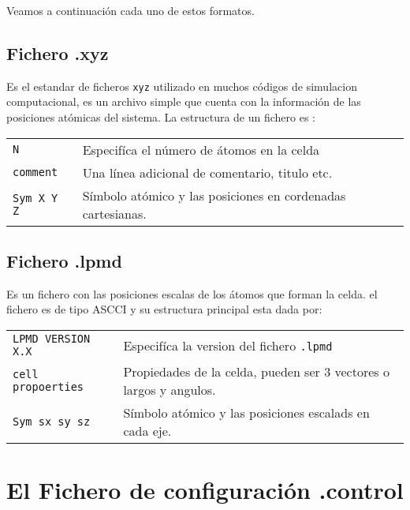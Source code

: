 \documentclass[a4paper,10pt]{scrbook}
\begin{document}
Veamos a continuaci\'on cada uno de estos formatos.

\subsection{Fichero .xyz}

Es el estandar de ficheros \verb|xyz| utilizado en muchos c\'odigos de simulacion computacional, es un archivo simple que cuenta con la informaci\'on de las posiciones at\'omicas del sistema. La estructura de un fichero es :
\begin{center}
\begin{tabular}{l|l}
 \verb|N| & Especif\'ica el n\'umero de \'atomos en la celda \\
 \verb|comment| & Una l\'inea adicional de comentario, titulo etc. \\
 \verb|Sym X Y Z| & S\'imbolo at\'omico y las posiciones en cordenadas cartesianas. \\
\end{tabular}
\end{center}

\subsection{Fichero .lpmd}

Es un fichero con las posiciones escalas de los \'atomos que forman la celda. el fichero es de tipo ASCCI y su estructura principal esta dada por:

\begin{center}
 \begin{tabular}{l|l}
 \verb|LPMD VERSION X.X | & Especif\'ica la version del fichero \verb|.lpmd| \\
 \verb|cell propoerties | & Propiedades de la celda, pueden ser 3 vectores o largos y angulos. \\
 \verb|Sym sx sy sz| & S\'imbolo at\'omico y las posiciones escalads en cada eje.\\
\end{tabular}
\end{center}


\section{El Fichero de configuraci\'on .control}
\end{document}
